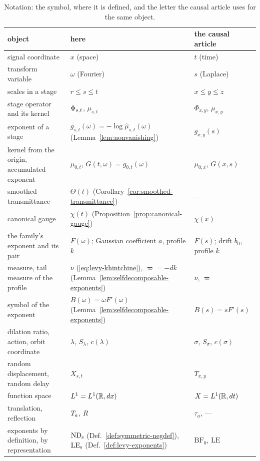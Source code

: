 \begin{table}[!htb]
\centering
\caption{Notation: the symbol, where it is defined, and the letter the causal article uses
for the same object.}
\label{tab:notation}
\footnotesize
\setlength{\tabcolsep}{4pt}
\begin{tabular}{@{}lll@{}}
\toprule
object & here & the causal article \\
\midrule
signal coordinate & $x$ (space) & $t$ (time) \\
transform variable & $\omega$ (Fourier) & $s$ (Laplace) \\
scales in a stage & $r \le s \le t$ & $x \le y \le z$ \\
stage operator and its kernel & $\Phi_{s,t}$, $\mu_{s,t}$ & $\Phi_{x,y}$, $\mu_{x,y}$ \\
exponent of a stage & $g_{s,t}(\omega) = -\log\hat\mu_{s,t}(\omega)$ (Lemma~\ref{lem:nonvanishing}) & $g_{x,y}(s)$ \\
kernel from the origin, accumulated exponent & $\mu_{0,t}$, $G(t,\omega) = g_{0,t}(\omega)$ & $\mu_{0,x}$, $G(x,s)$ \\
smoothed transmittance & $\Theta(t)$ (Corollary~\ref{cor:smoothed-transmittance}) & --- \\
canonical gauge & $\chi(t)$ (Proposition~\ref{prop:canonical-gauge}) & $\chi(x)$ \\
the family's exponent and its pair & $F(\omega)$; Gaussian coefficient $a$, profile $k$ & $F(s)$; drift $b_0$, profile $k$ \\
\Levy{} measure, tail measure of the profile & $\nu$ (\ref{eq:levy-khintchine}), $\varpi = -dk$ (Lemma~\ref{lem:selfdecomposable-exponents}) & $\nu$, $\varpi$ \\
symbol of the exponent & $B(\omega) = \omega F'(\omega)$ (Lemma~\ref{lem:selfdecomposable-exponents}) & $B(s) = sF'(s)$ \\
dilation ratio, action, orbit coordinate & $\lambda$, $S_\lambda$, $c(\lambda)$ & $\sigma$, $S_\sigma$, $c(\sigma)$ \\
random displacement, random delay & $X_{s,t}$ & $T_{x,y}$ \\
function space & $L^1 = L^1(\mathbb{R},dx)$ & $X = L^1(\mathbb{R},dt)$ \\
translation, reflection & $T_{a}$, $R$ & $\tau_a$, --- \\
exponents by definition, by representation & $\mathrm{ND}_{\mathrm{s}}$ (Def.~\ref{def:symmetric-negdef}), $\mathrm{LE}_{\mathrm{s}}$ (Def.~\ref{def:levy-exponents}) & $\mathrm{BF}_0$, $\mathrm{LE}$ \\
\bottomrule
\end{tabular}
\end{table}

